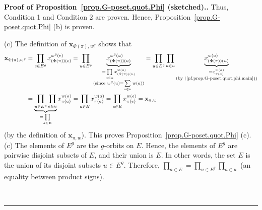 \documentclass[numbers=enddot,12pt,final,onecolumn,notitlepage,abstracton]{scrartcl}
\theoremstyle{definition}
\newenvironment{proof}[1][Proof]{\noindent\textbf{#1.} }{\ \rule{0.5em}{0.5em}}
\let\sumnonlimits\sum
\let\prodnonlimits\prod
\renewcommand{\sum}{\sumnonlimits\limits}
\renewcommand{\prod}{\prodnonlimits\limits}
\newenvironment{verlong}{}{}
\newenvironment{vershort}{}{}
\newcommand{\xx}{{\mathbf{x}}}
\begin{document}
\begin{proof}[Proof of Proposition~\ref{prop.G-poset.quot.Phi} (sketched).]
Thus, Condition 1 and Condition 2 are proven. Hence,
Proposition~\ref{prop.G-poset.quot.Phi} (b) is proven.

\begin{vershort}
(c) 
The definition of $\xx_{\Phi\left(  \pi\right)  ,w^{g}}$ shows that
\begin{align*}
\xx_{\Phi\left(  \pi\right)  ,w^{g}}
&= \prod_{e\in E^{g}}
 x_{\left( \Phi\left(  \pi\right)  \right)  \left(  e\right)  }^{
    w^{g}\left(  e\right) }
= \prod_{u\in E^{g}}
 \underbrace{x_{\left(  \Phi\left(  \pi\right)  \right)
    \left(  u\right)  }^{w^{g}\left(  u\right)  }}_{
    \substack{=\prod_{a\in u}x_{\left(  \Phi\left(  \pi\right) 
    \right)  \left(  u\right)  }^{w\left( a\right)  }\\\text{(since }
    w^{g}\left(  u\right)  =\sum\limits_{a\in u}w\left(  a\right)
    \text{)}}}
= \prod_{u\in E^{g}} \prod_{a\in u}
  \underbrace{x_{\left(  \Phi\left(  \pi\right)  \right) 
    \left(  u\right) }^{w\left(  a\right)  }}_{
    \substack{=x_{\pi\left(  a\right)  }^{w\left( a\right)  }\\
    \text{(by (\ref{pf.prop.G-poset.quot.phi.main}))}}}\\
&= \underbrace{\prod_{u\in E^{g}}\prod_{a\in u}}_{=\prod_{a\in E}}
  x_{\pi\left(  a\right)  }^{w\left(  a\right)  }
=\prod_{a\in E}x_{\pi\left( a\right)  }^{w\left(  a\right)  }
=\prod_{e\in E}x_{\pi\left(  e\right) }^{w\left(  e\right)  }
=\xx_{\pi,w}%
\end{align*}
(by the definition of $\xx_{\pi,w}$). This proves
Proposition~\ref{prop.G-poset.quot.Phi} (c).
\end{vershort}
\begin{verlong}
(c) The elements of $E^g$ are the $g$-orbits on $E$. Hence, the
elements of $E^g$ are pairwise disjoint subsets of $E$, and their
union is $E$. In other words, the set $E$ is the union of its
disjoint subsets $u \in E^g$. Therefore,
$\prod_{a\in E} = \prod_{u\in E^{g}} \prod_{a\in u}$ (an equality
between product signs).


\end{verlong}
\end{proof}
\end{document}
